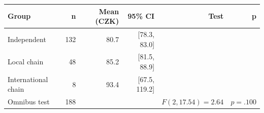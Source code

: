 \begin{tabular}{lrrrrr}
\toprule
Group & n & Mean (CZK) & 95\% CI & Test & p \\
\midrule
Independent & 132 & 80.7 & [78.3, 83.0] &  &  \\
Local chain & 48 & 85.2 & [81.5, 88.9] &  &  \\
International chain & 8 & 93.4 & [67.5, 119.2] &  &  \\
Omnibus test & 188 &  &  & $F(2, 17.54)=2.64$ & $p=.100$ \\
\bottomrule
\end{tabular}
